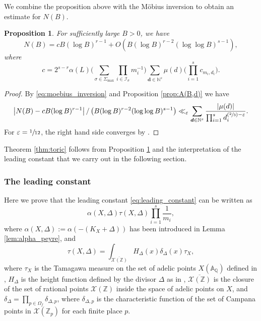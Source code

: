 \documentclass[11pt]{article}
\numberwithin{equation}{section}
\newcommand{\Psfrac}[2]{(\sfrac{#1}{#2})}
\newcommand{\bfd}{\boldsymbol{d}}
\newcommand\ZZ{\mathbb{Z}}
\newcommand\NN{\mathbb{N}}
\newcommand\QQ{\mathbb{Q}}
\newcommand{\ic}[1]{\mathcal{I}_{#1}}
\newtheorem{prop}[theorem]{Proposition}
\theoremstyle{definition}
\numberwithin{theorem}{section}
\begin{document}
We combine the proposition above with the Möbius inversion to obtain an estimate for $N(B)$.

\begin{prop}
\label{prop:final_estimate}
For sufficiently large $B>0$, we have
\[
N(B) = c B(\log B)^{r-1} + O(
B(\log B)^{r-2}(\log\log B)^{s-1}),
\]
where
\begin{equation}
\label{eq:leading_constant}
c=2^{s-r}\alpha(L)\biggl(\sum_{\sigma\in\Sigma_{\max}}\prod_{i\in\ic{\sigma}}m_i^{-1}\biggr)
\sum_{\bfd\in\NN^{s}}\mu(d)
\biggl(\prod_{i=1}^sc_{m_i,d_i}\biggr).
\end{equation}
\end{prop}
\begin{proof}
By \eqref{eq:moebius_inversion} and Proposition \ref{prop:A(B,d)}
we have
\[
\left|
N(B)-
c B(\log B)^{r-1}
\right|
/ \left(B(\log B)^{r-2}(\log\log B)^{s-1} \right) \ll_{\varepsilon}
\sum_{\bfd\in\NN^{s}}\frac{|\mu(d)|}
{\prod_{i=1}^s d_i^{\Psfrac23-\varepsilon}}.
\]
For $\varepsilon=\sfrac1{12}$, the right hand side converges by \cite[Lem.\,11.15]{MR1679841}.
\end{proof}

Theorem \ref{thm:toric} follows from Proposition \ref{prop:final_estimate}
and the interpretation of the leading constant that we carry out in the following section.

\subsubsection{The leading constant}

Here we prove that the leading constant \eqref{eq:leading_constant} can be written as\vspace*{-3pt}
\begin{equation}
\label{eq:expected_leading_constant}
\alpha(X, \Delta)\tau(X,\Delta)\prod_{i=1}^s\frac 1{m_i},
\end{equation}
where $\alpha(X,\Delta):=\alpha(-(K_X+\Delta))$ has been introduced in
Lemma \ref{lem:alpha_peyre}, and\vspace*{-3pt}
\[
\tau(X,\Delta)=\int_{\overline {\mathscr X(\ZZ)}}H_{\Delta}(x) \delta_{\Delta}(x) \tau_X,
\]
where $\tau_X$ is the Tamagawa measure on the set of adelic points $X(\mathbb A_\QQ)$
defined in \cite[Def.\,2.8]{MR2740045},
$H_\Delta$ is the height function defined by the divisor $\Delta$ as in \cite[\S2.1]{MR1369408},
$\overline {\mathscr X(\ZZ)}$ is the closure of the set of rational points $\mathscr X(\ZZ)$
inside the space of adelic points on $X$,
and $\delta_{\Delta}=\prod_{p\in\Omega_f}\delta_{\Delta, p}$,
where $\delta_{\Delta,p}$ is the characteristic function of the set of
Campana points in $\mathscr{X}(\ZZ_p)$ for each finite place $p$.
\end{document}

